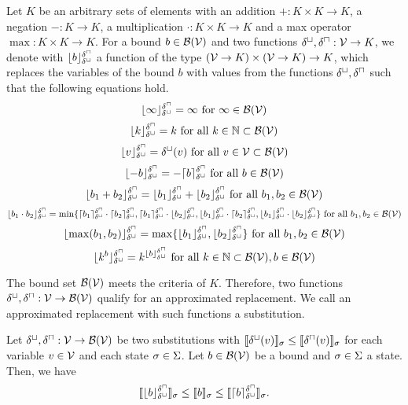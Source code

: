 \begin{definition}
  Let $K$ be an arbitrary sets of elements with an addition $+: K \times K \rightarrow K$, a negation $-: K \rightarrow K$, a multiplication $\cdot: K \times K \rightarrow K$ and a max operator $\max: K \times K \rightarrow K$.
  For a bound $b \in \mathcal{B}(\mathcal{V})$ and two functions $\delta^\sqcup, \delta^\sqcap: \mathcal{V} \rightarrow K$, we denote with $\lfloor b \rfloor^{\delta^\sqcap}_{\delta^\sqcup}$ a function of the type $(\mathcal{V} \rightarrow K) \times (\mathcal{V} \rightarrow K) \rightarrow K$, which replaces the variables of the bound $b$ with values from the functions $\delta^\sqcup, \delta^\sqcap$ such that the following equations hold.
  \[ \lfloor \infty \rfloor^{\delta^\sqcap}_{\delta^\sqcup} = \infty \text{ for } \infty \in \mathcal{B}(\mathcal{V}) \]
  \[ \lfloor k \rfloor^{\delta^\sqcap}_{\delta^\sqcup} = k \text{ for all } k \in \mathbb{N} \subset \mathcal{B}(\mathcal{V}) \] 
  \[ \lfloor v \rfloor^{\delta^\sqcap}_{\delta^\sqcup} = \delta^\sqcup(v) \text{ for all } v \in \mathcal{V} \subset \mathcal{B}(\mathcal{V}) \] 
  \[ \lfloor -b \rfloor^{\delta^\sqcap}_{\delta^\sqcup} = -\lceil b \rceil^{\delta^\sqcap}_{\delta^\sqcup} \text{ for all } b \in \mathcal{B}(\mathcal{V}) \] 
  \[ \lfloor b_1 + b_2 \rfloor^{\delta^\sqcap}_{\delta^\sqcup} = \lfloor b_1 \rfloor^{\delta^\sqcap}_{\delta^\sqcup} + \lfloor b_2 \rfloor^{\delta^\sqcap}_{\delta^\sqcup} \text{ for all } b_1, b_2 \in \mathcal{B}(\mathcal{V}) \] 
  \[ \lfloor b_1 \cdot b_2 \rfloor^{\delta^\sqcap}_{\delta^\sqcup} = \min \lbrace 
    \lceil b_1 \rceil^{\delta^\sqcap}_{\delta^\sqcup} \cdot \lceil b_2 \rceil^{\delta^\sqcap}_{\delta^\sqcup},
    \lceil b_1 \rceil^{\delta^\sqcap}_{\delta^\sqcup} \cdot \lfloor b_2 \rfloor^{\delta^\sqcap}_{\delta^\sqcup},
    \lfloor b_1 \rfloor^{\delta^\sqcap}_{\delta^\sqcup} \cdot \lceil b_2 \rceil^{\delta^\sqcap}_{\delta^\sqcup},
    \lfloor b_1 \rfloor^{\delta^\sqcap}_{\delta^\sqcup} \cdot \lfloor b_2 \rfloor^{\delta^\sqcap}_{\delta^\sqcup}
   \rbrace \text{ for all } b_1, b_2 \in \mathcal{B}(\mathcal{V}) \] 
  \[ \lfloor \max(b_1, b_2) \rfloor^{\delta^\sqcap}_{\delta^\sqcup} = \max \lbrace \lfloor b_1 \rfloor^{\delta^\sqcap}_{\delta^\sqcup}, \lfloor b_2 \rfloor^{\delta^\sqcap}_{\delta^\sqcup} \rbrace \text{ for all } b_1, b_2 \in \mathcal{B}(\mathcal{V}) \]
  \[ \lfloor k^b \rfloor^{\delta^\sqcap}_{\delta^\sqcup} = k^{\lfloor b \rfloor^{\delta^\sqcap}_{\delta^\sqcup}} \text{ for all } k \in \mathbb{N} \subset \mathcal{B}(\mathcal{V}), b \in \mathcal{B}(\mathcal{V}) \]  
\end{definition}

The bound set $\mathcal{B}(\mathcal{V})$ meets the criteria of $K$.
Therefore, two functions $\delta^\sqcup, \delta^\sqcap: \mathcal{V} \rightarrow \mathcal{B}(\mathcal{V})$ qualify for an approximated replacement.
We call an approximated replacement with such functions a substitution.


\begin{theorem}
  Let $\delta^\sqcup, \delta^\sqcap: \mathcal{V} \rightarrow \mathcal{B}(\mathcal{V})$ be two substitutions with $\llbracket \delta^\sqcup(v) \rrbracket_{\sigma} \leq \llbracket \delta^\sqcap(v) \rrbracket_{\sigma}$ for each variable $v \in \mathcal{V}$ and each state $\sigma \in \Sigma$.
  Let $b \in \mathcal{B}(\mathcal{V})$ be a bound and $\sigma \in \Sigma$ a state.
  Then, we have
  \[ \llbracket \lfloor b \rfloor^{\delta^\sqcap}_{\delta^\sqcup} \rrbracket_{\sigma} \leq \llbracket b \rrbracket_{\sigma} \leq \llbracket \lceil b \rceil^{\delta^\sqcap}_{\delta^\sqcup} \rrbracket_{\sigma}. \]
\end{theorem}

